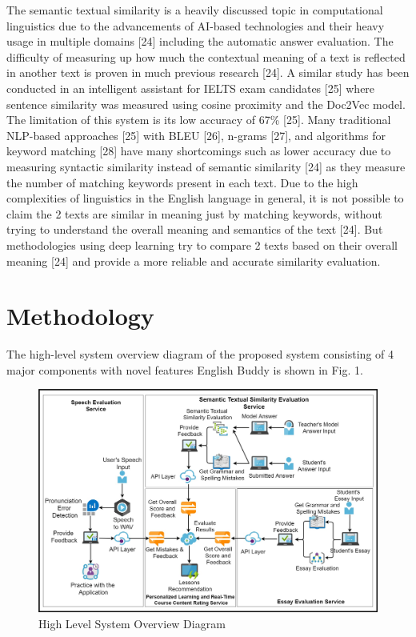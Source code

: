 \documentclass[conference]{IEEEtran}
\begin{document}
The semantic textual similarity is a heavily discussed topic in computational linguistics due to the advancements of AI-based technologies and their heavy usage in multiple domains [24] including the automatic answer evaluation. The difficulty of measuring up how much the contextual meaning of a text is reflected in another text is proven in much previous research [24]. A similar study has been conducted in an intelligent assistant for IELTS exam candidates [25] where sentence similarity was measured using cosine proximity and the Doc2Vec model. The limitation of this system is its low accuracy of 67\% [25]. Many traditional NLP-based approaches [25] with BLEU [26], n-grams [27], and algorithms for keyword matching [28] have many shortcomings such as lower accuracy due to measuring syntactic similarity instead of semantic similarity [24] as they measure the number of matching keywords present in each text. Due to the high complexities of linguistics in the English language in general, it is not possible to claim the 2 texts are similar in meaning just by matching keywords, without trying to understand the overall meaning and semantics of the text [24]. But methodologies using deep learning try to compare 2 texts based on their overall meaning [24] and provide a more reliable and accurate similarity evaluation.

\section{Methodology}

The high-level system overview diagram of the proposed system consisting of 4 major components with novel features English Buddy is shown in Fig. 1.

\begin{figure}[htbp]
\centerline{\includegraphics[scale=0.15]{team_system_diagram.jpg}}
\caption{High Level System Overview Diagram}
\end{figure}
\end{document}
